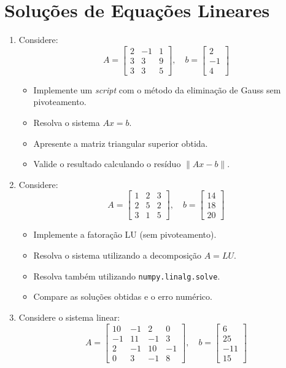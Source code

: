 \section{Soluções de Equações Lineares} \label{sec:SolSistLineares}

\begin{enumerate}[label=\thesection.\arabic*]
\item Considere:
\[
A =
\begin{bmatrix}
2 & -1 & 1 \\
3 & 3 & 9 \\
3 & 3 & 5
\end{bmatrix},
\quad
b =
\begin{bmatrix}
2 \\ -1 \\ 4
\end{bmatrix}
\]

\begin{itemize}
    \item Implemente um \textit{script} com o método da eliminação de Gauss sem pivoteamento.
    \item Resolva o sistema $Ax = b$.
    \item Apresente a matriz triangular superior obtida.
    \item Valide o resultado calculando o resíduo $\|Ax - b\|$.
\end{itemize}

\item Considere:
\[
A =
\begin{bmatrix}
1 & 2 & 3 \\
2 & 5 & 2 \\
3 & 1 & 5
\end{bmatrix},
\quad
b =
\begin{bmatrix}
14 \\ 18 \\ 20
\end{bmatrix}
\]

\begin{itemize}
    \item Implemente a fatoração LU (sem pivoteamento).
    \item Resolva o sistema utilizando a decomposição $A = LU$.
    \item Resolva também utilizando \texttt{numpy.linalg.solve}.
    \item Compare as soluções obtidas e o erro numérico.
\end{itemize}

\item Considere o sistema linear:
\[
A =
\begin{bmatrix}
10 & -1 & 2 & 0 \\
-1 & 11 & -1 & 3 \\
2 & -1 & 10 & -1 \\
0 & 3 & -1 & 8
\end{bmatrix},
\quad
b =
\begin{bmatrix}
6 \\ 25 \\ -11 \\ 15
\end{bmatrix}
\]


\end{enumerate}
